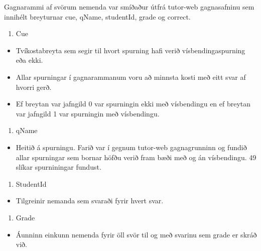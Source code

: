 \documentclass[
  10pt,
]{article}
\providecommand{\tightlist}{%
  \setlength{\itemsep}{0pt}\setlength{\parskip}{0pt}}
\begin{document}
Gagnarammi af svörum nemenda var smíðaður útfrá tutor-web gagnasafninu sem innihélt breyturnar cue, qName, studentId, grade og correct.

\begin{enumerate}
\def\labelenumi{\arabic{enumi}.}
\tightlist
\item
  Cue
\end{enumerate}

\begin{itemize}
\tightlist
\item
  Tvíkostabreyta sem segir til hvort spurning hafi verið vísbendingaspurning eða ekki.
\item
  Allar spurningar í gagnarammanum voru að minnsta kosti með eitt svar af hvorri gerð.
\item
  Ef breytan var jafngild 0 var spurningin ekki með vísbendingu en ef breytan var jafngild 1 var spurningin með vísbendingu.
\end{itemize}

\begin{enumerate}
\def\labelenumi{\arabic{enumi}.}
\setcounter{enumi}{1}
\tightlist
\item
  qName
\end{enumerate}

\begin{itemize}
\tightlist
\item
  Heitið á spurningu. Farið var í gegnum tutor-web gagnagrunninn og fundið allar spurningar sem bornar höfðu verið fram bæði með og án vísbendingu. 49 slíkar spurniningar fundust.
\end{itemize}

\begin{enumerate}
\def\labelenumi{\arabic{enumi}.}
\setcounter{enumi}{2}
\tightlist
\item
  StudentId
\end{enumerate}

\begin{itemize}
\tightlist
\item
  Tilgreinir nemanda sem svaraði fyrir hvert svar.
\end{itemize}

\begin{enumerate}
\def\labelenumi{\arabic{enumi}.}
\setcounter{enumi}{3}
\tightlist
\item
  Grade
\end{enumerate}

\begin{itemize}
\tightlist
\item
  Áunninn einkunn nemenda fyrir öll svör til og með svarinu sem grade er skráð við.
\end{itemize}
\end{document}
